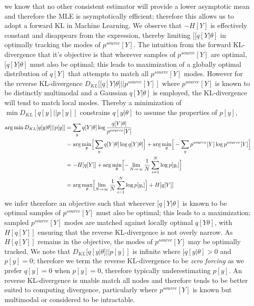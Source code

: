 \documentclass[7pt]{article}
\begin{document}
we know that no other consistent estimator will provide a lower asymptotic mean and therefore the MLE is asymptotically efficient; therefore this allows us to adopt a forward KL in Machine Learning. We observe that $-H[Y]$ is effectively constant and disappears from the expression, thereby limiting $[[q[Y|\theta]$  in optimally tracking the modes of $p^{source}[Y]$.  The intuition  from the forward KL-divergence that it's objective is that wherever samples of $p^{source}[Y]$ are optimal, $[q[Y|\theta]$ must also be optimal; this leads to maximization of a globally optimal distribution of $q[Y]$ that attempts to match all $p^{source}[Y]$ modes. However for the reverse KL-divergence $D_{KL} [[q[Y|\theta]||p^{source}[Y]]$ where $p^{source}[Y]$ is known to be distinctly multimodal and a Gaussian $q[Y|\theta]$ is employed, the KL-divergence will tend to match local modes. Thereby a minimization of $\min D_{KL} [q[y]||p[y]]$ constrains $q[y|\theta]$ to assume the properties of $p[y]$,
\begin{equation}
\begin{split}
\arg \min D_{KL} [q[y|\theta]||p[y]] & = \sum_{y} q[Y|\theta] \log \dfrac{q[Y|\theta]}{p^{source}[Y] }  \\
& =  \arg \min_{\theta} \Bigr[ \sum_{y}  q[Y|\theta]  \log {q[Y|\theta]} \Bigr] + \arg \min_{\theta} \Bigr[ - \sum_{y} p^{source}[Y] \log {p^{source}[Y] } \Bigr] \\
 & = -H[q[Y]] + \arg \min_{\theta} \Bigl[ - \lim\limits_{ N \rightarrow \infty } \dfrac{1}{N} \sum^N_{i=1} \log p[y_i]\Bigr]  \\
 & = \arg \max_{\theta} \Bigl[ \lim\limits_{ N \rightarrow \infty } \dfrac{1}{N} \sum^N_{i=1} \log p[y_i]\Bigr]  + H[q[Y]]  \\
\end{split}
\end{equation}
we infer therefore an objective such that wherever $[q[Y|\theta]$ is known to be optimal samples of $p^{source}[Y]$ must also be optimal; this leads to a maximization; sampled $p^{source}[Y]$ modes are matched against locally optimal $q[Y\theta]$, with $H[q[Y]]$ ensuring that the reverse KL-divergence is not overly narrow. As $H[q[Y]]$ remains in the objective, the modes of $p^{source}[Y]$ may be optimally tracked. We note that $D_{KL} [q[y|\theta]||p[y]]$ is infinite where $[q[y|\theta] > 0$ and $p[y]=0$; therefore we term the reverse KL-divergence to be \emph{zero forcing} as we prefer $q[y]=0$ when $p[y]=0$, therefore typically underestimating $p[y]$.  An reverse KL-divergence is unable match all nodes and therefore tends to be better suited to computing divergence, particularly where  $p^{source}[Y]$ is known but multimodal or considered to be intractable.
\end{document}
